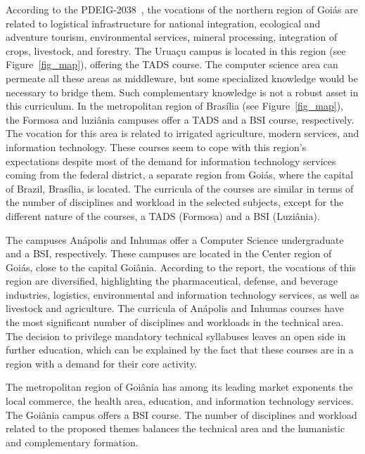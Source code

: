 \documentclass[sigconf, review]{educomp}
\begin{document}


According to the PDEIG-2038~\citep{goias2038}, the vocations of the northern region of Goiás are related to logistical infrastructure for national integration, ecological and adventure tourism, environmental services, mineral processing, integration of crops, livestock, and forestry.
The Uruaçu campus is located in this region (see Figure~\ref{fig_map}), offering the TADS course.
The computer science area can permeate all these areas as middleware, but some specialized knowledge would be necessary to bridge them.
Such complementary knowledge is not a robust asset in this curriculum.
In the metropolitan region of Brasília (see Figure~\ref{fig_map}), the Formosa and luziânia campuses offer a TADS and a BSI course, respectively. 
The vocation for this area is related to irrigated agriculture, modern services, and information technology.
These courses seem to cope with this region's expectations despite most of the demand for information technology services coming from the federal district, a separate region from Goiás, where the capital of Brazil, Brasília, is located.
The curricula of the courses are similar in terms of the number of disciplines and workload in the selected subjects, except for the different nature of the courses, a TADS (Formosa) and a BSI (Luziânia).

The campuses Anápolis and Inhumas offer a Computer Science undergraduate and a BSI, respectively.
These campuses are located in the Center region of Goiás, close to the capital Goiânia.
According to the report, the vocations of this region are diversified, highlighting the pharmaceutical, defense, and beverage industries, logistics, environmental and information technology services, as well as livestock and agriculture.
The curricula of Anápolis and Inhumas courses have the most significant number of disciplines and workloads in the technical area.
The decision to privilege mandatory technical syllabuses leaves an open side in further education, which can be explained by the fact that these courses are in a region with a demand for their core activity.

The metropolitan region of Goiânia has among its leading market exponents the local commerce, the health area, education, and information technology services.
The Goiânia campus offers a BSI course.
The number of disciplines and workload related to the proposed themes balances the technical area and the humanistic and complementary formation.
\end{document}
